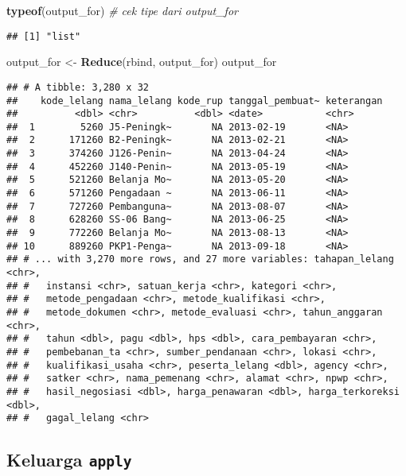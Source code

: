 \documentclass[]{article}
\newenvironment{Shaded}{\begin{snugshade}}{\end{snugshade}}
\newcommand{\CommentTok}[1]{\textcolor[rgb]{0.56,0.35,0.01}{\textit{#1}}}
\newcommand{\KeywordTok}[1]{\textcolor[rgb]{0.13,0.29,0.53}{\textbf{#1}}}
\newcommand{\NormalTok}[1]{#1}
\newcommand{\StringTok}[1]{\textcolor[rgb]{0.31,0.60,0.02}{#1}}
\begin{document}
\begin{Shaded}
\begin{Highlighting}[]
\KeywordTok{typeof}\NormalTok{(output_for) }\CommentTok{# cek tipe dari output_for}
\end{Highlighting}
\end{Shaded}

\begin{verbatim}
## [1] "list"
\end{verbatim}

\begin{Shaded}
\begin{Highlighting}[]
\NormalTok{output_for <-}\StringTok{ }\KeywordTok{Reduce}\NormalTok{(rbind, output_for)}
\NormalTok{output_for}
\end{Highlighting}
\end{Shaded}

\begin{verbatim}
## # A tibble: 3,280 x 32
##    kode_lelang nama_lelang kode_rup tanggal_pembuat~ keterangan
##          <dbl> <chr>          <dbl> <date>           <chr>     
##  1        5260 J5-Peningk~       NA 2013-02-19       <NA>      
##  2      171260 B2-Peningk~       NA 2013-02-21       <NA>      
##  3      374260 J126-Penin~       NA 2013-04-24       <NA>      
##  4      452260 J140-Penin~       NA 2013-05-19       <NA>      
##  5      521260 Belanja Mo~       NA 2013-05-20       <NA>      
##  6      571260 Pengadaan ~       NA 2013-06-11       <NA>      
##  7      727260 Pembanguna~       NA 2013-08-07       <NA>      
##  8      628260 SS-06 Bang~       NA 2013-06-25       <NA>      
##  9      772260 Belanja Mo~       NA 2013-08-13       <NA>      
## 10      889260 PKP1-Penga~       NA 2013-09-18       <NA>      
## # ... with 3,270 more rows, and 27 more variables: tahapan_lelang <chr>,
## #   instansi <chr>, satuan_kerja <chr>, kategori <chr>,
## #   metode_pengadaan <chr>, metode_kualifikasi <chr>,
## #   metode_dokumen <chr>, metode_evaluasi <chr>, tahun_anggaran <chr>,
## #   tahun <dbl>, pagu <dbl>, hps <dbl>, cara_pembayaran <chr>,
## #   pembebanan_ta <chr>, sumber_pendanaan <chr>, lokasi <chr>,
## #   kualifikasi_usaha <chr>, peserta_lelang <dbl>, agency <chr>,
## #   satker <chr>, nama_pemenang <chr>, alamat <chr>, npwp <chr>,
## #   hasil_negosiasi <dbl>, harga_penawaran <dbl>, harga_terkoreksi <dbl>,
## #   gagal_lelang <chr>
\end{verbatim}

\hypertarget{keluarga-apply}{%
\subsection{\texorpdfstring{Keluarga
\texttt{apply}}{Keluarga apply}}\label{keluarga-apply}}
\end{document}
